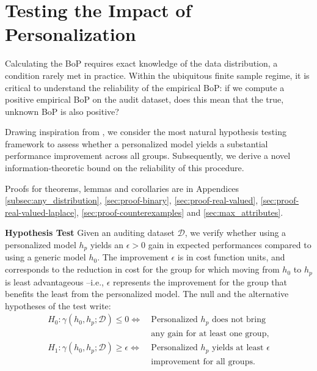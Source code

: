 \section{Testing the Impact of Personalization}\label{sec:validation}


Calculating the BoP requires exact knowledge of the data distribution, a condition rarely met in practice. Within the ubiquitous finite sample regime, it is critical to understand the reliability of the empirical BoP: if we compute a positive empirical BoP on the audit dataset, does this mean that the true, unknown BoP is also positive?


Drawing inspiration from \cite{monteiro2022epistemic}, we consider the most natural hypothesis testing framework to assess whether a personalized model yields a substantial performance improvement across all groups. Subsequently, we derive a novel information-theoretic bound on the reliability of this procedure. 

Proofs for theorems, lemmas and corollaries are in Appendices
\ref{subsec:any_distribution}, \ref{sec:proof-binary}, \ref{sec:proof-real-valued}, \ref{sec:proof-real-valued-laplace}, \ref{sec:proof-counterexamples} and \ref{sec:max_attributes}.



\textbf{Hypothesis Test} Given an auditing dataset $\mathcal{D}$, we verify whether using a personalized model $h_p$ yields an $\epsilon>0$ gain in expected performances compared to using a generic model $h_0$. 
The improvement $\epsilon$ is in cost function units, and corresponds to the reduction in cost for the group for which moving from $h_0$ to $h_p$ is least advantageous --i.e., $\epsilon$ represents the improvement for the group that benefits the least from the personalized model. 
The null and the alternative hypotheses of the test write:
\begin{align*}
H_0: \gamma(h_0, h_p; \mathcal{D}) \leq 0  
\Leftrightarrow &
\ \text{Personalized $h_p$ does not bring} \\ & \ \text{any gain for at least one group,} \\
H_1: \gamma(h_0, h_p; \mathcal{D}) 
\geq \epsilon 
\Leftrightarrow &
\ \text{Personalized $h_p$ yields at least $\epsilon$} \\ & \ \text{improvement for all groups.}
\end{align*}

